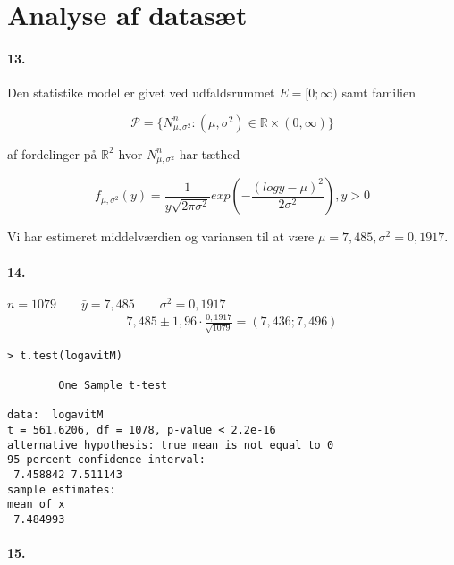 \section{Analyse af datasæt}

\paragraph{13.}
Den statistike model er givet ved udfaldsrummet $E=[0; \infty)$ samt
familien

\begin{equation*}
  \mathcal{P} =\{ N^n_{\mu,\sigma^2} : (\mu, \sigma^2) \in \mathbb{R}
  \times (0, \infty) \}
\end{equation*}

af fordelinger på $\mathbb{R}^2$ hvor $N^n_{\mu, \sigma^2}$ har tæthed

\begin{equation*}
  f_{\mu, \sigma^2}(y) = \frac{1}{y \sqrt{2\pi\sigma^2}} exp ( -
  \frac{(log y - \mu)^2}{2\sigma^2} ), y>0
\end{equation*}

Vi har estimeret middelværdien og variansen til at være $\mu = 7,485 ,
\sigma^2 = 0,1917$.


\paragraph{14.} 
$n = 1079 \qquad \bar{y} = 7,485 \qquad \sigma^2 = 0,1917$
\begin{align*}
7,485 \pm 1,96 \cdot \frac{0,1917}{\sqrt{1079}} = (7,436 ; 7,496)
\end{align*}

\begin{verbatim}
> t.test(logavitM)

        One Sample t-test

data:  logavitM 
t = 561.6206, df = 1078, p-value < 2.2e-16
alternative hypothesis: true mean is not equal to 0 
95 percent confidence interval:
 7.458842 7.511143 
sample estimates:
mean of x 
 7.484993 
\end{verbatim}

\paragraph{15.}
